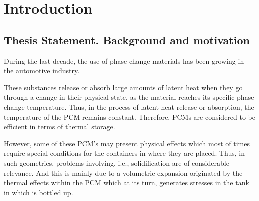 
\chapter{Introduction} %

\label{Chapter1} %


\newcommand{\keyword}[1]{\textbf{#1}}
\newcommand{\tabhead}[1]{\textbf{#1}}
\newcommand{\code}[1]{\texttt{#1}}
\newcommand{\file}[1]{\texttt{\bfseries#1}}
\newcommand{\option}[1]{\texttt{\itshape#1}}
\setcounter{secnumdepth}{4}

\section{Thesis Statement. Background and motivation}

\setlength{\parindent}{0.5cm} During the last decade, the use of phase change materials has been growing in the automotive industry. 

\noindent These substances release or absorb large amounts of latent heat when they go through a change in their physical state, as the material reaches its specific phase change temperature. Thus, in the process of latent heat release or absorption, the temperature of the PCM remains constant. Therefore, PCMs are considered to be efficient in terms of thermal storage. 

\noindent However, some of these PCM's may present physical effects which most of times require special conditions for the containers in where they are placed. Thus, in such geometries, problems involving, i.e., solidification are of considerable relevance. And this is mainly due to a volumetric expansion originated by the thermal effects within the PCM which at its turn, generates stresses in the tank in which is bottled up.

